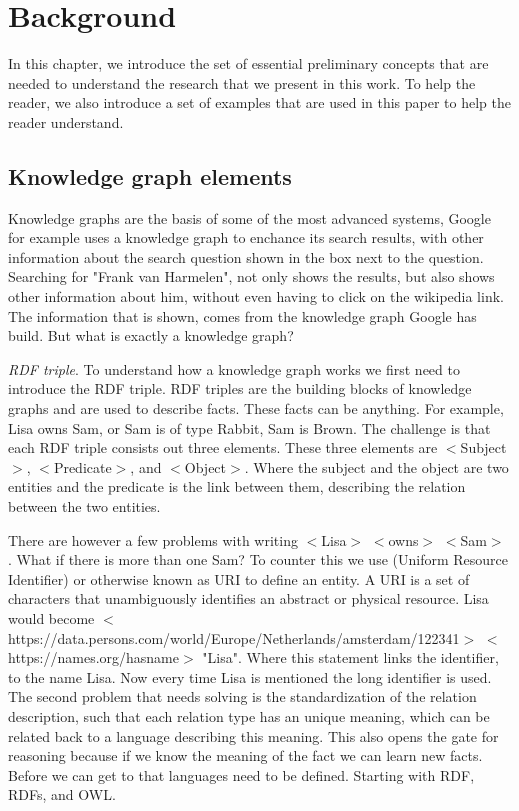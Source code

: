 \documentclass[11pt,letterpaper ,oneside ]{book}
\begin{document}
\newpage
\chapter{Background}\label{Background}
In this chapter, we introduce the set of essential preliminary concepts that are needed to understand the research that we present in this work. To help the reader, we also introduce a set of examples that are used in this paper to help the reader understand.

\section{Knowledge graph elements}\label{graphElements}
Knowledge graphs are the basis of some of the most advanced systems, Google for example uses a knowledge graph to enchance its search results, with other information about the search question shown in the box next to the question. Searching for "Frank van Harmelen", not only shows the results, but also shows other information about him, without even having to click on the wikipedia link. The information that is shown, comes from the knowledge graph Google has build. But what is exactly a knowledge graph?

\textit{RDF triple}. To understand how a knowledge graph works we first need to introduce the RDF triple. RDF triples are the building blocks of knowledge graphs and are used to describe facts. These facts can be anything. For example, Lisa owns Sam, or Sam is of type Rabbit, Sam is Brown.  The challenge is that each RDF triple consists out three elements.
These three elements are $<$Subject$>$, $<$Predicate$>$, and $<$Object$>$. Where the subject and the object are two entities and the predicate is the link between them, describing the relation between the two entities. 

There are however a few problems with writing $<$Lisa$>$ $<$owns$>$ $<$Sam$>$ . What if there is more than one Sam? To counter this we use (Uniform Resource Identifier) or otherwise known as URI to define an entity. A URI is a set of characters that unambiguously identifies an abstract or physical resource. Lisa would become $<$https://data.persons.com/world/Europe/Netherlands/amsterdam/122341$>$ $<$https://names.org/hasname$>$ "Lisa". Where this statement links the identifier, to the name Lisa. Now every time Lisa is mentioned the long identifier is used. 
The second problem that needs solving is the standardization of the relation description, such that each relation type has an unique meaning, which can be related back to a language describing this meaning. This also opens the gate for reasoning because if we know the meaning of the fact we can learn new facts. Before we can get to that languages need to be defined. Starting with RDF, RDFs, and OWL.
\end{document}
